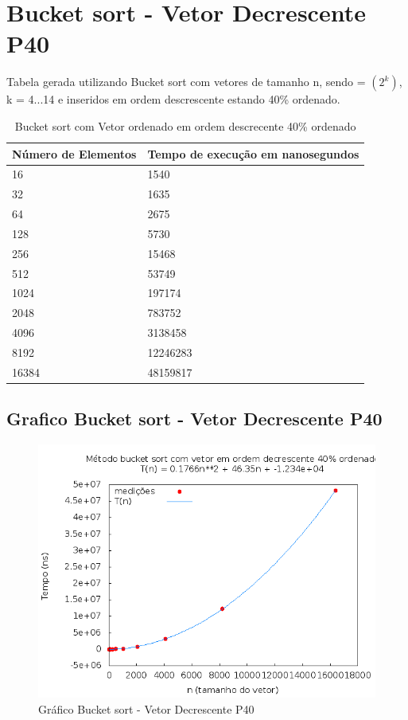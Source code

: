 \documentclass[12pt,a4paper,twoside]{report}
\begin{document}
\section{Bucket sort - Vetor Decrescente P40}
Tabela gerada utilizando Bucket sort com vetores de tamanho n, sendo = $(2^k)$, k = 4...14 e inseridos em ordem descrescente estando 40\% ordenado.

\begin{table}[H]
\centering
\caption{Bucket sort com Vetor ordenado em ordem descrecente 40\% ordenado}
\label{my-label}
\begin{tabular}{|l|l|}
\hline
\multicolumn{1}{|c|}{\textbf{Número de Elementos}} & \multicolumn{1}{c|}{\textbf{Tempo de execução em nanosegundos}} \\ \hline
16 & 1540 \\ \hline
32 & 1635 \\ \hline
64 & 2675 \\ \hline
128 & 5730 \\ \hline
256 & 15468 \\ \hline
512 & 53749 \\ \hline
1024 & 197174 \\ \hline
2048 & 783752 \\ \hline
4096 & 3138458 \\ \hline
8192 & 12246283 \\ \hline
16384 & 48159817 \\ \hline
\end{tabular}
\end{table}

\subsection{Grafico Bucket sort - Vetor Decrescente P40}
\begin{figure}[H]
    \centering
    \includegraphics[width=0.7\linewidth]{graficos/Bucket/vIntDecrescenteP40/vIntDecrescenteP40.png}
  \caption{Gráfico Bucket sort - Vetor Decrescente P40}
\end{figure}
\end{document}
